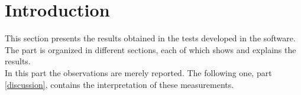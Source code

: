\section{Introduction}

This section presents the results obtained in the tests developed in the software. The part is organized in different sections, each of which shows and explains the results. 
\\

In this part the observations are merely reported. The following one, part \ref{discussion}, contains the interpretation of these measurements. 